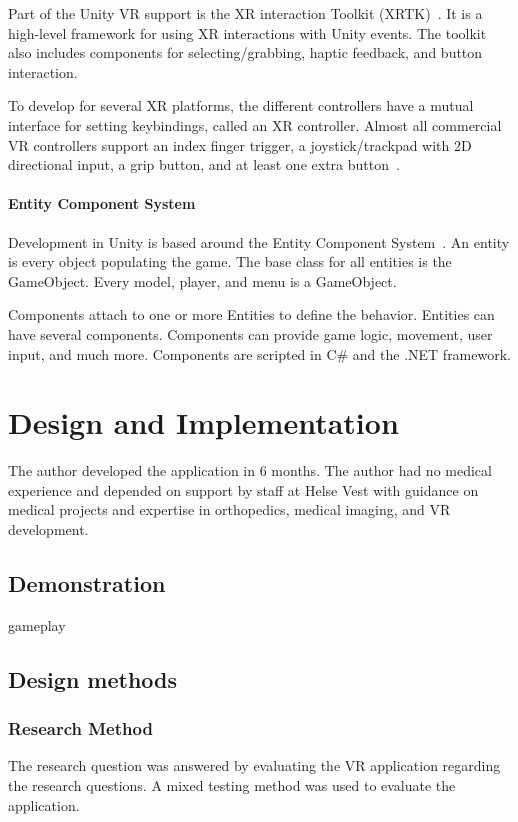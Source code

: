 \documentclass[a4paper]{report}
\begin{document}
Part of the Unity VR support is the XR interaction Toolkit (XRTK)~\cite{noauthor_xr_nodate}. It is a high-level framework for using XR interactions with Unity events. The toolkit also includes components for selecting/grabbing, haptic feedback, and button interaction.

To develop for several XR platforms, the different controllers have a mutual interface for setting keybindings, called an XR controller. Almost all commercial VR controllers support an index finger trigger, a joystick/trackpad with 2D directional input, a grip button, and at least one extra button~\cite{technologies_unity_nodate}.

\subsubsection{Entity Component System}
Development in Unity is based around the Entity Component System~\cite{entitycomponent_entities_nodate}. An entity is every object populating the game. The base class for all entities is the GameObject. Every model, player, and menu is a GameObject.

Components attach to one or more Entities to define the behavior. Entities can have several components. Components can provide game logic, movement, user input, and much more. Components are scripted in C\# and the .NET framework.




\chapter{Design and Implementation}\label{Design and Implementation}
The author developed the application in 6 months. The author had no medical experience and depended on support by staff at Helse Vest with guidance on medical projects and expertise in orthopedics, medical imaging, and VR development.

\section{Demonstration}\label{demonstration}
gameplay

\section{Design methods}

\subsection{Research Method}
The research question was answered by evaluating the VR application regarding the research questions. A mixed testing method was used to evaluate the application.
\end{document}
